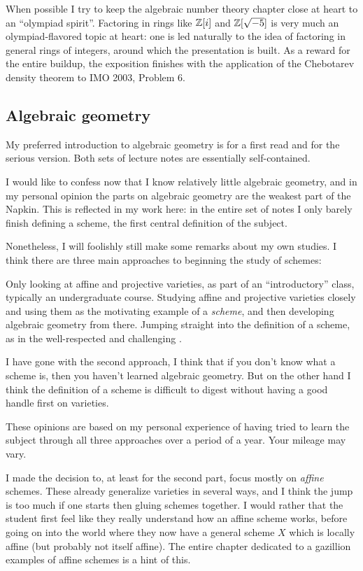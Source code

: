 When possible I try to keep the algebraic number theory chapter close at
heart to an ``olympiad spirit''.
Factoring in rings like $\mathbb Z[i]$ and $\mathbb Z[\sqrt{-5}]$
is very much an olympiad-flavored topic at heart:
one is led naturally to the idea of factoring in general rings of integers,
around which the presentation is built.
As a reward for the entire buildup, the exposition finishes
with the application of the Chebotarev density theorem to IMO 2003, Problem 6.

\subsection{Algebraic geometry}
My preferred introduction to algebraic geometry is \cite{ref:gathmann}
for a first read and \cite{ref:vakil} for the serious version.
Both sets of lecture notes are essentially self-contained.

I would like to confess now that I know relatively little algebraic geometry,
and in my personal opinion the parts on algebraic geometry
are the weakest part of the Napkin.
This is reflected in my work here:
in the entire set of notes I only barely finish defining a scheme,
the first central definition of the subject.

Nonetheless, I will foolishly still make some remarks about my own studies.
I think there are three main approaches to beginning the study of schemes:
\begin{itemize}
	\ii Only looking at affine and projective varieties,
	as part of an ``introductory'' class,
	typically an undergraduate course.
	\ii Studying affine and projective varieties closely
	and using them as the motivating example of a \emph{scheme},
	and then developing algebraic geometry from there.
	\ii Jumping straight into the definition of a scheme,
	as in the well-respected and challenging \cite{ref:vakil}.
\end{itemize}
I have gone with the second approach,
I think that if you don't know what a scheme is,
then you haven't learned algebraic geometry.
But on the other hand I think the definition of a scheme is
difficult to digest without having a good handle first on varieties.

These opinions are based on my personal experience of having
tried to learn the subject through all
three approaches over a period of a year.
Your mileage may vary.

I made the decision to, at least for the second part,
focus mostly on \emph{affine} schemes.
These already generalize varieties in several ways,
and I think the jump is too much if one starts
then gluing schemes together.
I would rather that the student first feel like
they really understand how an affine scheme works,
before going on into the world where they now have a general scheme $X$
which is locally affine (but probably not itself affine).
The entire chapter dedicated to a gazillion examples
of affine schemes is a hint of this.

